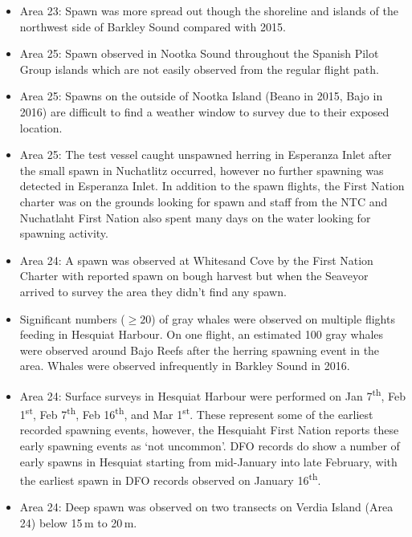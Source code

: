\begin{itemize}
\item Area 23: Spawn was more spread out though the shoreline and islands of the northwest side of Barkley Sound compared with 2015.
\item Area 25: Spawn observed in Nootka Sound throughout the Spanish Pilot Group islands which are not easily observed from the regular flight path.
\item Area 25: Spawns on the outside of Nootka Island (Beano in 2015, Bajo in 2016) are difficult to find a weather window to survey due to their exposed location.
\item Area 25: The test vessel caught unspawned herring in Esperanza Inlet after the small spawn in Nuchatlitz occurred, however no further spawning was detected in Esperanza Inlet.
In addition to the spawn flights, the First Nation charter was on the grounds looking for spawn and staff from the NTC and Nuchatlaht First Nation also spent many days on the water looking for spawning activity.
\item Area 24: A spawn was observed at Whitesand Cove by the First Nation Charter with reported spawn on bough harvest but when the Seaveyor arrived
to survey the area they didn’t find any spawn.
\item Significant numbers ($\geq20$) of gray whales were observed on multiple flights feeding in Hesquiat Harbour.
On one flight, an estimated 100 gray whales were observed around Bajo Reefs after the herring spawning event in the area.
Whales were observed infrequently in Barkley Sound in 2016.
\item Area 24: Surface surveys in Hesquiat Harbour were performed on Jan 7\textsuperscript{th}, Feb 1\textsuperscript{st}, Feb 7\textsuperscript{th}, Feb 16\textsuperscript{th}, and Mar 1\textsuperscript{st}. 
These represent some of the earliest recorded spawning events, however, the Hesquiaht First Nation reports these early spawning events as `not uncommon'.
DFO records do show a number of early spawns in Hesquiat starting from mid-January into late February, with the earliest spawn in DFO records observed on January 16\textsuperscript{th}. 
\item Area 24: Deep spawn was observed on two transects on Verdia Island (Area 24) below 15\,m to 20\,m.
\end{itemize}